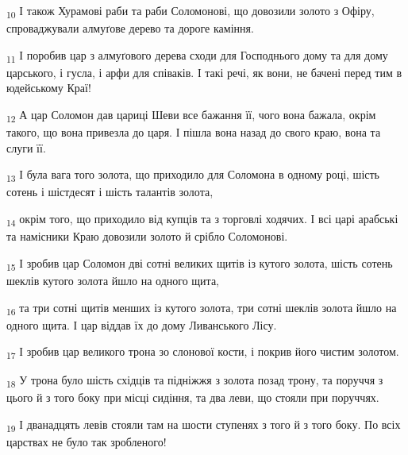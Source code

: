 \begin{tcolorbox}
\textsubscript{10} І також Хурамові раби та раби Соломонові, що довозили золото з Офіру, спроваджували алмуґове дерево та дороге каміння.
\end{tcolorbox}
\begin{tcolorbox}
\textsubscript{11} І поробив цар з алмуґового дерева сходи для Господнього дому та для дому царського, і гусла, і арфи для співаків. І такі речі, як вони, не бачені перед тим в юдейському Краї!
\end{tcolorbox}
\begin{tcolorbox}
\textsubscript{12} А цар Соломон дав цариці Шеви все бажання її, чого вона бажала, окрім такого, що вона привезла до царя. І пішла вона назад до свого краю, вона та слуги її.
\end{tcolorbox}
\begin{tcolorbox}
\textsubscript{13} І була вага того золота, що приходило для Соломона в одному році, шість сотень і шістдесят і шість талантів золота,
\end{tcolorbox}
\begin{tcolorbox}
\textsubscript{14} окрім того, що приходило від купців та з торговлі ходячих. І всі царі арабські та намісники Краю довозили золото й срібло Соломонові.
\end{tcolorbox}
\begin{tcolorbox}
\textsubscript{15} І зробив цар Соломон дві сотні великих щитів із кутого золота, шість сотень шеклів кутого золота йшло на одного щита,
\end{tcolorbox}
\begin{tcolorbox}
\textsubscript{16} та три сотні щитів менших із кутого золота, три сотні шеклів золота йшло на одного щита. І цар віддав їх до дому Ливанського Лісу.
\end{tcolorbox}
\begin{tcolorbox}
\textsubscript{17} І зробив цар великого трона зо слонової кости, і покрив його чистим золотом.
\end{tcolorbox}
\begin{tcolorbox}
\textsubscript{18} У трона було шість східців та підніжжя з золота позад трону, та поруччя з цього й з того боку при місці сидіння, та два леви, що стояли при поруччях.
\end{tcolorbox}
\begin{tcolorbox}
\textsubscript{19} І дванадцять левів стояли там на шости ступенях з того й з того боку. По всіх царствах не було так зробленого!
\end{tcolorbox}

